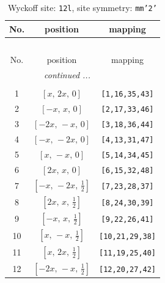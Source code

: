 \documentclass[fleqn,8pt]{jsarticle}
\begin{document}
\begin{longtable}{ccc}
\caption{Wyckoff site: {\tt 12l}, site symmetry: {\tt mm'2'}}
 \\
 \hline \hline
No. & position & mapping \\ \hline \endfirsthead

\multicolumn{2}{l}{\tablename\ \thetable{}} \\
 \hline \hline
No. & position & mapping \\ \hline \endhead

 \hline \hline
\multicolumn{2}{r}{\footnotesize\it continued ...} \\ \endfoot

 \hline \hline
\multicolumn{2}{r}{} \\ \endlastfoot

1 & $\left[ x,\, 2 x,\, 0 \right]$ & {\tt [1,16,35,43]} \\ \hline
2 & $\left[ - x,\, x,\, 0 \right]$ & {\tt [2,17,33,46]} \\ \hline
3 & $\left[ - 2 x,\, - x,\, 0 \right]$ & {\tt [3,18,36,44]} \\ \hline
4 & $\left[ - x,\, - 2 x,\, 0 \right]$ & {\tt [4,13,31,47]} \\ \hline
5 & $\left[ x,\, - x,\, 0 \right]$ & {\tt [5,14,34,45]} \\ \hline
6 & $\left[ 2 x,\, x,\, 0 \right]$ & {\tt [6,15,32,48]} \\ \hline
7 & $\left[ - x,\, - 2 x,\, \frac{1}{2} \right]$ & {\tt [7,23,28,37]} \\ \hline
8 & $\left[ 2 x,\, x,\, \frac{1}{2} \right]$ & {\tt [8,24,30,39]} \\ \hline
9 & $\left[ - x,\, x,\, \frac{1}{2} \right]$ & {\tt [9,22,26,41]} \\ \hline
10 & $\left[ x,\, - x,\, \frac{1}{2} \right]$ & {\tt [10,21,29,38]} \\ \hline
11 & $\left[ x,\, 2 x,\, \frac{1}{2} \right]$ & {\tt [11,19,25,40]} \\ \hline
12 & $\left[ - 2 x,\, - x,\, \frac{1}{2} \right]$ & {\tt [12,20,27,42]} \\
\end{longtable}
\renewcommand{\arraystretch}{1.2}
\end{document}
